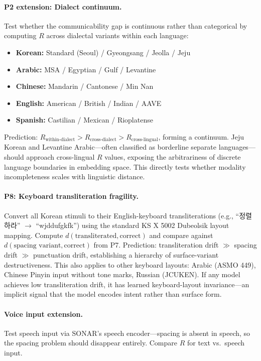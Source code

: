 \documentclass[11pt]{article}
\theoremstyle{definition}
\begin{document}
\paragraph{P2 extension: Dialect continuum.}
Test whether the communicability gap is continuous rather than categorical by computing $R$ across dialectal variants within each language:
\begin{itemize}[nosep]
  \item \textbf{Korean:} Standard (Seoul) / Gyeongsang / Jeolla / Jeju
  \item \textbf{Arabic:} MSA / Egyptian / Gulf / Levantine
  \item \textbf{Chinese:} Mandarin / Cantonese / Min Nan
  \item \textbf{English:} American / British / Indian / AAVE
  \item \textbf{Spanish:} Castilian / Mexican / Rioplatense
\end{itemize}
Prediction: $R_{\text{within-dialect}} > R_{\text{cross-dialect}} > R_{\text{cross-lingual}}$, forming a continuum. Jeju Korean and Levantine Arabic---often classified as borderline separate languages---should approach cross-lingual $R$ values, exposing the arbitrariness of discrete language boundaries in embedding space. This directly tests whether modality incompleteness scales with linguistic distance.

\paragraph{P8: Keyboard transliteration fragility.}
Convert all Korean stimuli to their English-keyboard transliterations (e.g., ``정렬하라'' $\to$ ``wjddufgkfk'') using the standard KS X 5002 Dubeolsik layout mapping. Compute $d(\text{transliterated}, \text{correct})$ and compare against $d(\text{spacing variant}, \text{correct})$ from P7. Prediction: transliteration drift $\gg$ spacing drift $\gg$ punctuation drift, establishing a hierarchy of surface-variant destructiveness. This also applies to other keyboard layouts: Arabic (ASMO 449), Chinese Pinyin input without tone marks, Russian (JCUKEN). If any model achieves low transliteration drift, it has learned keyboard-layout invariance---an implicit signal that the model encodes intent rather than surface form.

\paragraph{Voice input extension.}
Test speech input via SONAR's speech encoder---spacing is absent in speech, so the spacing problem should disappear entirely. Compare $R$ for text vs.\ speech input.
\end{document}
